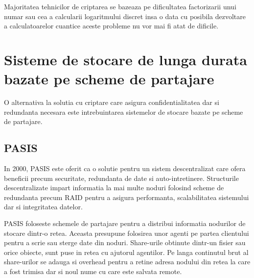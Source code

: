 \documentclass{llncs}
\begin{document}
Majoritatea tehnicilor de criptarea se bazeaza pe dificultatea factorizarii unui numar sau cea a calcularii logaritmului discret insa o data cu posibila dezvoltare a calculatoarelor cuantice aceste probleme nu vor mai fi atat de dificile. \cite{Shor:1994}

\section{Sisteme de stocare de lunga durata bazate pe scheme de partajare}

O alternativa la solutia cu criptare care asigura confidentialitatea dar si redundanta necesara este intrebuintarea sistemelor de stocare bazate pe scheme de partajare. \cite{W:2000,SB:2005,SGMV:2009}


\subsection{PASIS}
In 2000, PASIS este oferit ca o solutie pentru un sistem descentralizat care ofera beneficii precum securitate, redundanta de date si auto-intretinere.
Structurile descentralizate impart informatia la mai multe noduri folosind scheme de redundanta precum RAID pentru a asigura performanta, scalabilitatea sistemului dar si integritatea datelor. \cite{Patterson:1988}

PASIS foloseste schemele de partajare pentru a distribui informatia nodurilor de stocare dintr-o retea. Aceasta presupune folosirea unor agenti pe partea clientului pentru a scrie sau sterge date din noduri. Share-urile obtinute dintr-un fisier sau orice obiecte, sunt puse in retea cu ajutorul agentilor. Pe langa continutul brut al share-urilor se adauga si overhead pentru a retine adresa nodului din retea la care a fost trimisa dar si noul nume cu care este salvata remote.
\end{document}
